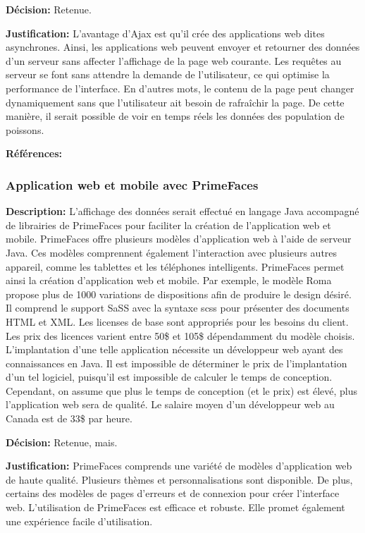 \textbf{Décision:} Retenue.

\textbf{Justification:} L'avantage d'Ajax est qu'il crée des applications web dites asynchrones. Ainsi, les applications web peuvent envoyer et retourner des données d'un serveur sans affecter l'affichage de la page web courante. Les requêtes au serveur se font sans attendre la demande de l'utilisateur, ce qui optimise la performance de l'interface. En d'autres mots, le contenu de la page peut changer dynamiquement sans que l'utilisateur ait besoin de rafraîchir la page. De cette manière, il serait possible de voir en temps réels les données des population de poissons.

\textbf{Références:} \cite{Ajax_wiki} \cite{Ajax} \cite{Csoft}

\subsubsection{Application web et mobile avec PrimeFaces}

\textbf{Description:} L'affichage des données serait effectué en langage Java accompagné de librairies de PrimeFaces pour faciliter la création de l'application web et mobile. PrimeFaces offre plusieurs modèles d'application web à l'aide de serveur Java. Ces modèles comprennent également l'interaction avec plusieurs autres appareil, comme les tablettes et les téléphones intelligents. PrimeFaces permet ainsi la création d'application web et mobile. Par exemple, le modèle Roma propose plus de 1000 variations de dispositions afin de produire le design désiré. Il comprend le support SaSS avec la syntaxe scss pour présenter des documents HTML et XML. Les licenses de base sont appropriés pour les besoins du client. Les prix des licences varient entre 50\$ et 105\$ dépendamment du modèle choisis. L'implantation d'une telle application nécessite un développeur web ayant des connaissances en Java. Il est impossible de déterminer le prix de l'implantation d'un tel logiciel, puisqu'il est impossible de calculer le temps de conception. Cependant, on assume que plus le temps de conception (et le prix) est élevé, plus l'application web sera de qualité. Le salaire moyen d'un développeur web au Canada est de 33\$ par heure.

\textbf{Décision:} Retenue, mais.

\textbf{Justification:} PrimeFaces comprends une variété de modèles d'application web de haute qualité. Plusieurs thèmes et personnalisations sont disponible. De plus, certains des modèles de pages d'erreurs et de connexion pour créer l'interface web. L'utilisation de PrimeFaces est efficace et robuste. Elle promet également une expérience facile d'utilisation.

